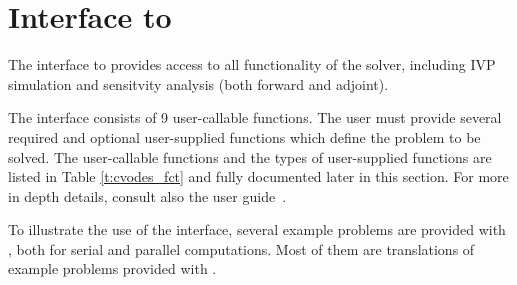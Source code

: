 \newpage
\section{{\matlab} Interface to {\cvodes}}

The {\matlab} interface to {\cvodes} provides access to all functionality of the 
{\cvodes} solver, including IVP simulation and sensitvity analysis (both forward 
and adjoint).

The interface consists of 9 user-callable functions. The user must provide
several required and optional user-supplied functions which define the problem to be solved.
The user-callable functions and the types of user-supplied functions are listed in
Table \ref{t:cvodes_fct} and fully documented later in this section.
For more in depth details, consult also the {\cvodes} user guide~\cite{cvodes_ug}.

To illustrate the use of the {\cvodes} {\matlab} interface, several example problems are provided
with {\sundialsTB}, both for serial and parallel computations. Most of them are {\matlab} translations of example
problems provided with {\cvodes}.

